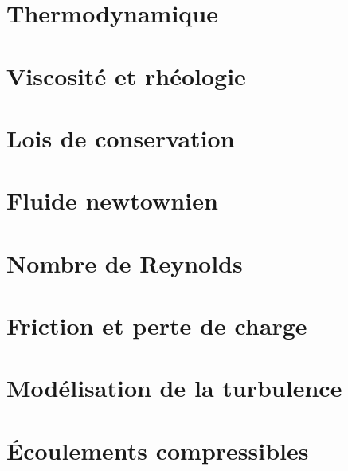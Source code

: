 \documentclass[10pt,a4paper,twocolumn,fleqn]{article}
\begin{document}
\section{Thermodynamique}


\section{Viscosité et rhéologie}\label{sec:rheo}


\section{Lois de conservation}


\section{Fluide newtownien}


\section{Nombre de Reynolds} %


\section{Friction et perte de charge} %


\section{Modélisation de la turbulence}


\section{Écoulements compressibles}

\end{document}

